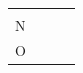 \begin{enumerate}[noitemsep, label=\textbf{\arabic*}. ]
{\begin{center}
\begin{xtabular*}{\mytablewidth}[t]{|p{10\mystarwidth}|p{10\mystarwidth}|p{10\mystarwidth}|p{10\mystarwidth}|}
    
         &
    
    
         &
    
    
     \tabularnewline{}
    
    
        \begin{math}\mathrm{N}\end{math} &
    
    
         &
    
    
         &
    
    
     \tabularnewline{}
    
    
        \begin{math}\mathrm{O}\end{math} &
    

\end{xtabular*}
\end{center}}
\end{enumerate}
